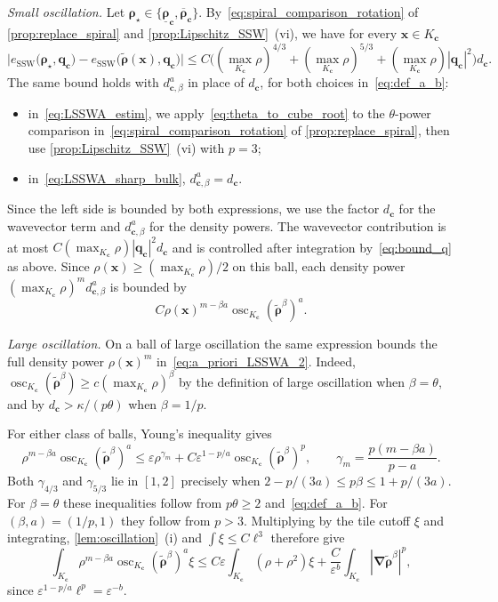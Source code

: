 \documentclass[final,reqno]{amsart}
\theoremstyle{remark}
\renewcommand{\le}{\leqslant}
\renewcommand{\ge}{\geqslant}
\renewcommand{\epsilon}{\varepsilon}
\newcommand{\ol}[1]{\overline{#1}}
\newcommand{\ul}[1]{\underline{#1}}
\newcommand{\wt}[1]{\widetilde{#1}}
\newcommand{\SSW}{\mathrm{SSW}}
\newcommand{\grad}{\bm{\nabla}}
\begin{document}
\noindent\emph{Small oscillation.} Let $\bm{\rho}_\star\in\{\ul{\bm{\rho}}_{\mathbf{c}},\ol{\bm{\rho}}_{\mathbf{c}}\}$. By~\cref{eq:spiral_comparison_rotation} of \cref{prop:replace_spiral} and \cref{prop:Lipschitz_SSW}~(vi), we have for every $\mathbf{x}\in K_{\mathbf{c}}$
\[
\big|e_\SSW\big(\bm{\rho}_\star,\mathbf{q}_{\mathbf{c}}\big)-e_\SSW\big(\wt{\bm{\rho}}(\mathbf{x}),\mathbf{q}_{\mathbf{c}}\big)\big|\le C\big((\max_{K_{\mathbf{c}}}\rho)^{4/3}+(\max_{K_{\mathbf{c}}}\rho)^{5/3}+(\max_{K_{\mathbf{c}}}\rho)|\mathbf{q}_{\mathbf{c}}|^2\big)d_{\mathbf{c}} .
\]
The same bound holds with $d_{\mathbf{c},\beta}^a$ in place of $d_{\mathbf{c}}$, for both choices in~\cref{eq:def_a_b}:
\begin{itemize}
\item in~\cref{eq:LSSWA_estim}, we apply~\cref{eq:theta_to_cube_root} to the $\theta$-power comparison in~\cref{eq:spiral_comparison_rotation} of \cref{prop:replace_spiral}, then use \cref{prop:Lipschitz_SSW}~(vi) with $p=3$;
\item in~\cref{eq:LSSWA_sharp_bulk}, $d_{\mathbf{c},\beta}^a=d_{\mathbf{c}}$.
\end{itemize}
Since the left side is bounded by both expressions, we use the factor $d_{\mathbf{c}}$ for the wavevector term and $d_{\mathbf{c},\beta}^a$ for the density powers. The wavevector contribution is at most $C(\max_{K_{\mathbf{c}}}\rho)|\mathbf{q}_{\mathbf{c}}|^2d_{\mathbf{c}}$ and is controlled after integration by~\cref{eq:bound_q} as above. Since $\rho(\mathbf{x})\ge(\max_{K_{\mathbf{c}}}\rho)/2$ on this ball, each density power $(\max_{K_{\mathbf{c}}}\rho)^m d_{\mathbf{c},\beta}^a$ is bounded by
\[
C\rho(\mathbf{x})^{m-\beta a}\operatorname{osc}_{K_{\mathbf{c}}}(\wt{\bm{\rho}}^\beta)^a .
\]

\noindent\emph{Large oscillation.} On a ball of large oscillation the same expression bounds the full density power $\rho(\mathbf{x})^m$ in~\cref{eq:a_priori_LSSWA_2}. Indeed, $\operatorname{osc}_{K_{\mathbf{c}}}(\wt{\bm{\rho}}^\beta)\ge c(\max_{K_{\mathbf{c}}}\rho)^\beta$ by the definition of large oscillation when $\beta=\theta$, and by $d_{\mathbf{c}}>\kappa/(p\theta)$ when $\beta=1/p$.

For either class of balls, Young's inequality gives
\[
\rho^{m-\beta a}\operatorname{osc}_{K_{\mathbf{c}}}(\wt{\bm{\rho}}^\beta)^a
\le \epsilon\rho^{\gamma_m}
+C\epsilon^{1-p/a}\operatorname{osc}_{K_{\mathbf{c}}}(\wt{\bm{\rho}}^\beta)^p,
\qquad \gamma_m=\frac{p(m-\beta a)}{p-a}.
\]
Both $\gamma_{4/3}$ and $\gamma_{5/3}$ lie in $[1,2]$ precisely when
$2-p/(3a)\le p\beta\le1+p/(3a)$. For $\beta=\theta$ these inequalities follow from $p\theta\ge2$ and~\cref{eq:def_a_b}. For $(\beta,a)=(1/p,1)$ they follow from $p>3$. Multiplying by the tile cutoff $\xi$ and integrating, \cref{lem:oscillation}~(i) and $\int\xi\le C\ell^3$ therefore give
\begin{equation}\label{eq:density_interpolation}
\int_{K_{\mathbf{c}}}\rho^{m-\beta a}\operatorname{osc}_{K_{\mathbf{c}}}(\wt{\bm{\rho}}^\beta)^a\xi
\le C\epsilon\int_{K_{\mathbf{c}}}(\rho+\rho^2)\xi
+\frac{C}{\epsilon^b}\int_{K_{\mathbf{c}}}|\grad\wt{\bm{\rho}}^\beta|^p,
\end{equation}
since $\epsilon^{1-p/a}\ell^p=\epsilon^{-b}$.
\end{document}
